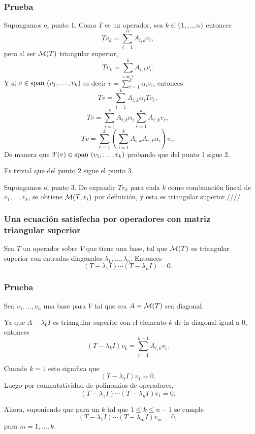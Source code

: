 \documentclass{article}
\begin{document}
\subsubsection*{Prueba}
Supongamos el punto 1. Como $T$
es un operador, sea $k\in\{1,\ldots,n\}$ entonces
$$Tv_k=\sum^n_{i=1} A_{i,k} v_i,$$
pero al ser $\mathcal{M}(T)$ triangular superior,
$$Tv_k=\sum^k_{i=1} A_{i,k} v_i.$$
Y si $v\in\text{span }(v_1,\ldots,v_k)$ es decir
$v=\sum^k_{i=1}\alpha_i v_i$, entonces
$$Tv=\sum^k_{i=1} A_{i,k} \alpha_i Tv_i,$$
$$Tv=\sum^k_{i=1} A_{i,k} \alpha_i \sum^k_{r=1} A_{r,k} v_r,$$
$$Tv=\sum^k_{r=1}\left(
    \sum^k_{i=1}A_{i,k}A_{r,k}\alpha_i\right) v_r.$$
De manera que $T(v)\in\text{span }(v_1,\ldots,v_k)$ probando que del
punto 1 sigue 2.

Es trivial que del punto 2 sigue el punto 3.

Supongamos el punto 3. De expandir $Tv_k$ para cada $k$
como combinación lineal de $v_1,\ldots,v_k$, se obtiene
$\mathcal{M}(T,v_i)$ por definición, y esta es
triangular superior.\hfill ////

\subsubsection{Una ecuación satisfecha por operadores con matriz triangular superior}
Sea $T$ un operador sobre $V$ que tiene una base, tal que
$\mathcal{M}(T)$ es triangular superior con entradas diagonales
$\lambda_1,\ldots,\lambda_n$. Entonces
$$(T-\lambda_1 I)\cdots(T-\lambda_n I) = 0.$$
\subsubsection*{Prueba}
Sea $v_1,\ldots,v_n$ una base para $V$ tal que sea $A=\mathcal{M}(T)$ sea 
diagonal.

Ya que $A-\lambda_k I$ es triangular superior con el
elemento $k$ de la diagonal igual a $0$, entonces
\begin{equation}
    \label{formasuma}
    (T-\lambda_k I)v_k=\sum^{k-1}_{i=1}A_{i,k} v_i.
\end{equation}

Cuando $k=1$ esto significa que
$$(T-\lambda_1 I)v_1 = 0.$$
Luego por conmutatividad de polinomios de operadores,
$$(T-\lambda_1 I)\cdots (T-\lambda_n I)v_1 = 0.$$

Ahora, suponiendo que para un $k$ tal que $1\leq k\leq n-1$
se cumple 
\begin{equation}\label{anuladores}
    (T-\lambda_1 I)\cdots(T-\lambda_m I)v_m = 0,
\end{equation}
para $m=1,\ldots,k$.
\end{document}
